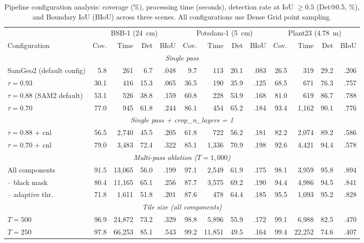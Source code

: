 \documentclass[review,11pt,authoryear]{elsarticle}
\begin{document}
\begin{table}[htbp]
\centering
\caption{Pipeline configuration analysis: coverage (\%), processing time (seconds), detection rate at IoU $\geq 0.5$ (Det@0.5, \%), and Boundary IoU (BIoU) across three scenes. All configurations use Dense Grid point sampling.}
\label{tab:config}
\scriptsize
\begin{tabular*}{\textwidth}{@{\extracolsep{\fill}}l@{\hspace{6pt}}rrrr@{\hspace{8pt}}rrrr@{\hspace{8pt}}rrrr}
\toprule
 & \multicolumn{4}{c}{BSB-1 (24~cm)} & \multicolumn{4}{c}{Potsdam-1 (5~cm)} & \multicolumn{4}{c}{Plant23 (4.78~m)} \\
\cmidrule(lr){2-5} \cmidrule(lr){6-9} \cmidrule(lr){10-13}
Configuration & Cov. & Time & Det & BIoU & Cov. & Time & Det & BIoU & Cov. & Time & Det & BIoU \\
\midrule
\multicolumn{13}{c}{\footnotesize\textit{Single pass}} \\
\midrule
SamGeo2 (default config) & 5.8 & 261 & 6.7 & .048 & 9.7 & 113 & 20.1 & .083 & 26.5 & 319 & 29.2 & .206 \\
$\tau = 0.93$ & 30.1 & 416 & 15.3 & .065 & 36.5 & 190 & 35.9 & .125 & 68.5 & 671 & 76.3 & .757 \\
$\tau = 0.88$ (SAM2 default) & 53.1 & 526 & 38.8 & .159 & 60.8 & 228 & 53.9 & .168 & 81.0 & 619 & 86.7 & .788 \\
$\tau = 0.70$ & 77.0 & 945 & 61.8 & .244 & 86.1 & 454 & 65.2 & .184 & 93.4 & 1{,}162 & 90.1 & .776 \\
\midrule
\multicolumn{13}{c}{\footnotesize\textit{Single pass + crop\_n\_layers = 1}} \\
\midrule
$\tau = 0.88$ + cnl & 56.5 & 2{,}740 & 45.5 & .205 & 61.8 & 722 & 56.2 & .181 & 82.2 & 2{,}074 & 89.2 & .586 \\
$\tau = 0.70$ + cnl & 79.0 & 3{,}483 & 72.4 & .322 & 85.1 & 1{,}336 & 70.9 & .198 & 92.6 & 4{,}421 & 94.4 & .578 \\
\midrule
\multicolumn{13}{c}{\footnotesize\textit{Multi-pass ablation ($T = 1{,}000$)}} \\
\midrule
All components & 91.5 & 13{,}065 & 56.0 & .199 & 97.1 & 2{,}549 & 61.9 & .175 & 98.1 & 3{,}959 & 95.8 & .894 \\
-- black mask & 80.4 & 11{,}165 & 65.1 & .256 & 87.7 & 3{,}575 & 69.2 & .190 & 94.4 & 4{,}986 & 94.5 & .841 \\
-- adaptive thr. & 71.8 & 1{,}611 & 51.8 & .201 & 87.6 & 478 & 64.4 & .185 & 95.5 & 1{,}093 & 95.2 & .828 \\
\midrule
\multicolumn{13}{c}{\footnotesize\textit{Tile size (all components)}} \\
\midrule
$T = 500$ & 96.9 & 24{,}872 & 73.2 & .329 & 98.8 & 5{,}896 & 55.9 & .172 & 99.1 & 6{,}988 & 82.5 & .470 \\
$T = 250$ & 97.8 & 66{,}253 & 85.1 & .543 & 99.2 & 11{,}851 & 49.5 & .164 & 99.4 & 22{,}252 & 74.6 & .407 \\
\bottomrule
\end{tabular*}
\end{table}
\end{document}
